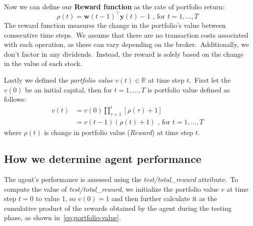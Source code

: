 \documentclass[../xlapes02]{subfiles}
\begin{document}
    Now we can define our \textbf{Reward function} as the rate of portfolio return:
    \begin{equation}
        \label{eq:rate-of-portfolio-return}
        \rho(t)=\bm{w}(t-1)^\top\bm{y}(t)-1\text{ , for }t=1,\ldots,T
    \end{equation}
    The reward function measures the change in the portfolio's value between consecutive time steps.\ We assume that there are no transaction costs associated with each operation, as these can vary depending on the broker.\ Additionally, we don't factor in any dividends.\ Instead, the reward is solely based on the change in the value of each stock.

    Lastly we defined the \emph{portfolio value} $v(t) \in \mathbb{R}$ at time step $t$.\ First let the $v(0)$ be an initial capital, then for $t=1,\ldots,T$ is portfolio value defined as follows:
    \begin{equation}
        \label{eq:portfolio-value}
        \begin{split}
            v(t) &=v(0)\prod_{\tau=1}^{t}\left[\rho(\tau)+1\right]\\
            &=v(t-1)(\rho(t)+1)
            \text{ , for }t=1,\ldots,T
        \end{split}
    \end{equation}
    where $\rho(t)$ is change in portfolio value (\emph{Reward}) at time step $t$.

    \subsection{How we determine agent performance}\label{subsec:how_we_calculate_agent_performance}
    The agent's performance is assessed using the \emph{test/total\_reward} attribute.\ To compute the value of \emph{test/total\_reward}, we initialize the portfolio value $v$ at time step $t=0$ to value 1, so $v(0)=1$ and then further calculate it as the cumulative product of the rewards obtained by the agent during the testing phase, as shown in~\cref{eq:portfolio-value}.
\end{document}
